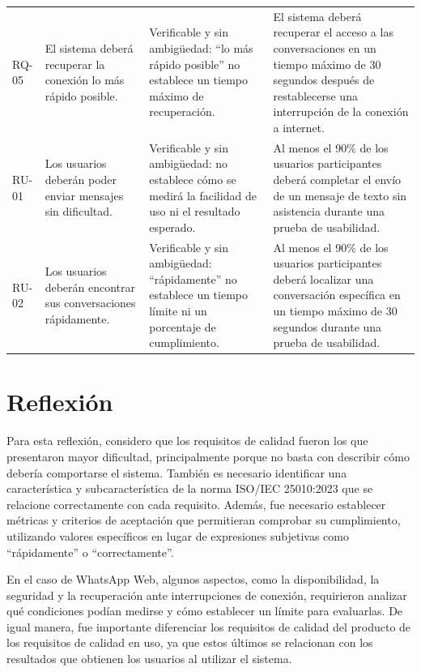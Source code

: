 \documentclass[12pt,a4paper,oneside]{article}
\begin{document}
\begin{longtable}{C{1.3cm} L{4.0cm} L{3.6cm} L{4.2cm}}
RQ-05 &
El sistema deberá recuperar la conexión lo más rápido posible. &
Verificable y sin ambigüedad: ``lo más rápido posible'' no establece un tiempo máximo de recuperación. &
El sistema deberá recuperar el acceso a las conversaciones en un tiempo máximo de 30 segundos después de restablecerse una interrupción de la conexión a internet. \\

RU-01 &
Los usuarios deberán poder enviar mensajes sin dificultad. &
Verificable y sin ambigüedad: no establece cómo se medirá la facilidad de uso ni el resultado esperado. &
Al menos el 90\% de los usuarios participantes deberá completar el envío de un mensaje de texto sin asistencia durante una prueba de usabilidad. \\

RU-02 &
Los usuarios deberán encontrar sus conversaciones rápidamente. &
Verificable y sin ambigüedad: ``rápidamente'' no establece un tiempo límite ni un porcentaje de cumplimiento. &
Al menos el 90\% de los usuarios participantes deberá localizar una conversación específica en un tiempo máximo de 30 segundos durante una prueba de usabilidad. \\

\end{longtable}
\normalsize


\section{Reflexión}

Para esta reflexión, considero que los requisitos de calidad fueron los que presentaron mayor dificultad, principalmente porque no basta con describir cómo debería comportarse el sistema. También es necesario identificar una característica y subcaracterística de la norma ISO/IEC 25010:2023 que se relacione correctamente con cada requisito. Además, fue necesario establecer métricas y criterios de aceptación que permitieran comprobar su cumplimiento, utilizando valores específicos en lugar de expresiones subjetivas como ``rápidamente'' o ``correctamente''.

En el caso de WhatsApp Web, algunos aspectos, como la disponibilidad, la seguridad y la recuperación ante interrupciones de conexión, requirieron analizar qué condiciones podían medirse y cómo establecer un límite para evaluarlas. De igual manera, fue importante diferenciar los requisitos de calidad del producto de los requisitos de calidad en uso, ya que estos últimos se relacionan con los resultados que obtienen los usuarios al utilizar el sistema.
\end{document}
